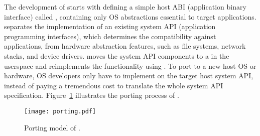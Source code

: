\papersection{\Thehostabi{}}
\label{sec:overview:host}

The development of \graphene{} starts with defining a simple host ABI (application binary interface) called \thehostabi{},
containing only OS abstractions essential to target applications.
\Thehostabi{} separates
the implementation of an existing system API (application programming interfaces), which determines the compatibility against applications,
from hardware abstraction features, such as file systems, network stacks, and device drivers. 
\graphene{} moves the system API components
to a \libos{} in the userspace and reimplements the functionality using \thehostabi{}.
To port \graphene{} to a new host OS or hardware,
OS developers only have to implement \thehostabi{} on the target host system API,
instead of paying a tremendous cost to translate the whole system API specification. Figure~\ref{fig:overview:porting} illustrates the porting process of \graphene{}.





\begin{figure}[t!]
\centering
\texttt{[image: porting.pdf]}
\caption{Porting model of \graphene{}.}
\label{fig:overview:porting}
\end{figure}



\label{sec:overview:host:pal}


